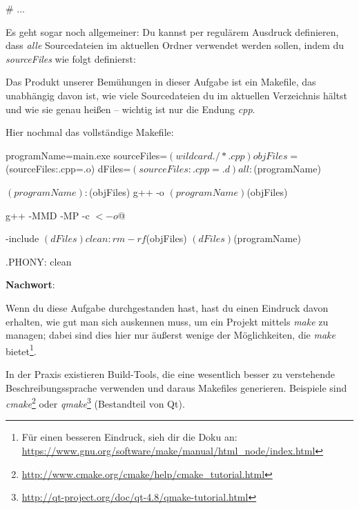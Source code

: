 \begin{enumerate}
\begin{lstmake}
# ...
\end{lstmake}

Es geht sogar noch allgemeiner:
Du kannst per regulärem Ausdruck definieren, dass \emph{alle} Sourcedateien im aktuellen Ordner verwendet werden sollen, indem du \emph{sourceFiles} wie folgt definierst:


\end{enumerate}

Das Produkt unserer Bemühungen in dieser Aufgabe ist ein Makefile, das unabhängig davon ist, wie viele Sourcedateien du im aktuellen Verzeichnis hältst und wie sie genau heißen -- wichtig ist nur die Endung \emph{cpp}.

Hier nochmal das vollständige Makefile:
\begin{lstmake}
programName=main.exe
sourceFiles=$(wildcard ./*.cpp)
objFiles=$(sourceFiles:.cpp=.o)
dFiles=$(sourceFiles:.cpp=.d)

all: $(programName)

$(programName): $(objFiles)
	g++ -o $(programName) $(objFiles)

	g++ -MMD -MP -c $< -o $@

-include $(dFiles)

clean:
	rm -rf $(objFiles) $(dFiles) $(programName)

.PHONY: clean
\end{lstmake}

\textbf{Nachwort}:

Wenn du diese Aufgabe durchgestanden hast, hast du einen Eindruck davon erhalten, wie gut man sich auskennen muss, um ein Projekt mittels \emph{make} zu managen;
dabei sind dies hier nur äußerst wenige der Möglichkeiten, die \emph{make} bietet\footnote{Für einen besseren Eindruck, sieh dir die Doku an: \url{https://www.gnu.org/software/make/manual/html_node/index.html}}.

In der Praxis existieren Build-Tools, die eine wesentlich besser zu verstehende Beschreibungssprache verwenden und daraus Makefiles generieren.
Beispiele sind \emph{cmake}\footnote{\url{http://www.cmake.org/cmake/help/cmake_tutorial.html}} oder \emph{qmake}\footnote{\url{http://qt-project.org/doc/qt-4.8/qmake-tutorial.html}} (Bestandteil von Qt).
